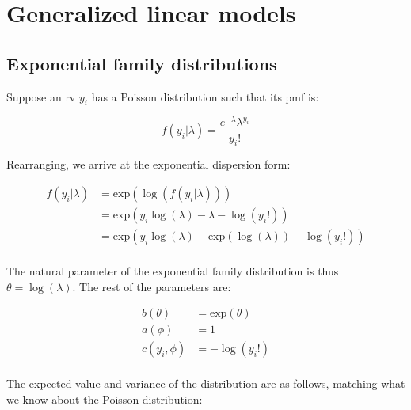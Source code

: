 \documentclass{report}
\begin{document}
\section{Generalized linear models}\label{sec:examples-glm}

\subsection{Exponential family distributions}

Suppose an \gls{rv} $y_i$ has a Poisson distribution such that its \gls{pmf} is:

\begin{equation}\label{eq:ex-glm-poisson-dist}
    f(y_i|\lambda) = \frac{e^{-\lambda}\lambda^{y_i}}{y_i!}
\end{equation}

Rearranging, we arrive at the exponential dispersion form:

\begin{equation}\label{eq:ex-glm-poisson-dist-exp-form}
    \begin{aligned}
        f(y_i|\lambda)
          &= \text{exp}(\log(f(y_i|\lambda))) \\
          &= \text{exp}(y_i\log(\lambda) - \lambda - \log(y_i!)) \\
          &= \text{exp}(y_i\log(\lambda) - \text{exp}(\log(\lambda)) - \log(y_i!)) \\
    \end{aligned}
\end{equation}

The natural parameter of the exponential family distribution is thus $\theta = \log(\lambda)$. The rest of the parameters are:

\begin{equation}\label{eq:ex-glm-poisson-dist-params}
    \begin{aligned}
        b(\theta) &= \text{exp}(\theta) \\
        a(\phi) &= 1 \\
        c(y_i, \phi) &= -\log(y_i!) \\
    \end{aligned}
\end{equation}

The expected value and variance of the distribution are as follows, matching what we know about the Poisson distribution:
\end{document}
